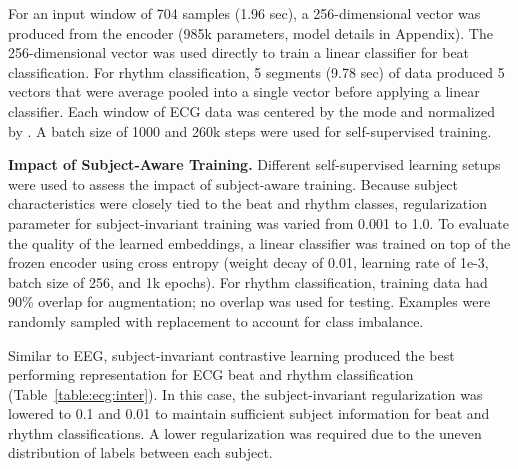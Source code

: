 \documentclass{article}
\renewcommand{\paragraph}[1]{\textbf{#1}\hspace{1em}}
\begin{document}
For an input window of 704 samples (1.96 sec), a 256-dimensional vector was
produced from the encoder  (985k parameters, model details in Appendix). The
256-dimensional vector was used directly to train a linear classifier for beat
classification. For rhythm classification, 5 segments (9.78 sec) of data
produced 5 vectors that were average pooled into a single vector before applying
a linear classifier. Each window of ECG data  was centered by the mode 
and normalized by . A batch size of
1000 and 260k steps were used for self-supervised training.


\paragraph{Impact of Subject-Aware Training.} Different self-supervised learning
setups were used to assess the impact of subject-aware training. Because subject
characteristics were closely tied to the beat and rhythm classes, regularization
parameter  for subject-invariant training was varied from 0.001 to 1.0.
To evaluate the quality of the learned embeddings, a linear classifier was
trained on top of the frozen encoder using cross entropy (weight decay of 0.01,
learning rate of 1e-3, batch size of 256, and 1k epochs). For rhythm
classification, training data had 90\% overlap for augmentation; no overlap was
used for testing. Examples were randomly sampled with replacement to account for
class imbalance.

Similar to EEG, subject-invariant contrastive learning produced the best
performing representation for ECG beat and rhythm classification
(Table~\ref{table:ecg:inter}). In this case, the subject-invariant
regularization  was lowered to 0.1 and 0.01 to maintain sufficient
subject information for beat and rhythm classifications. A lower regularization
was required due to the uneven distribution of labels between each subject.
\end{document}
